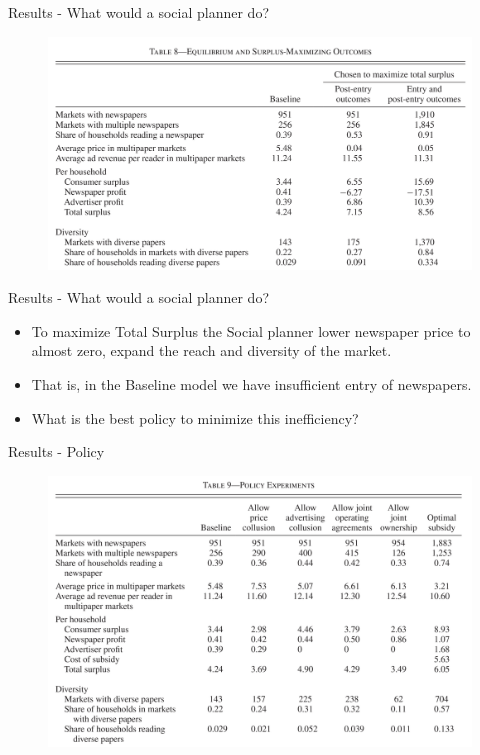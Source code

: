 \documentclass{beamer}
\begin{document}
\begin{frame}[t]{Results - What would a social planner do?}
  \begin{figure}
  \begin{center}
    \includegraphics[scale=0.15]{Table8.png}
  \end{center}
  \end{figure}
\end{frame}

\begin{frame}[t]{Results - What would a social planner do?}
  \begin{itemize}
    \item To maximize Total Surplus the Social planner lower newspaper price to
      almost zero, expand the reach and diversity of the market.
    \item That is, in the Baseline model we have insufficient entry of newspapers.
    \item What is the best policy to minimize this inefficiency?
  \end{itemize}
\end{frame}

\begin{frame}[t]{Results - Policy}
  \begin{figure}
  \begin{center}
    \includegraphics[scale=0.15]{Table9.png}
  \end{center}
  \end{figure}
\end{frame}
\end{document}
